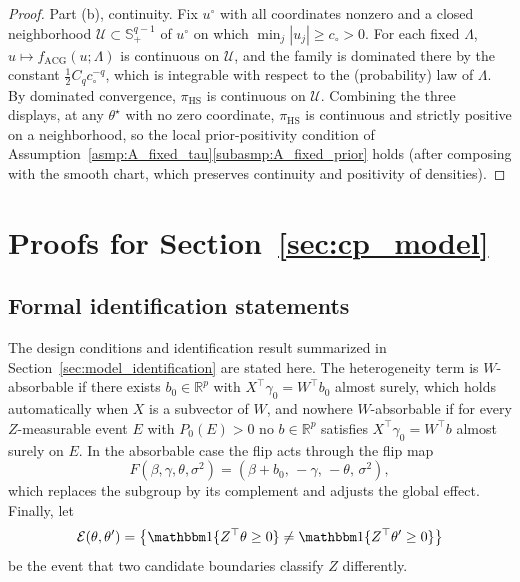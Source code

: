 \documentclass[11pt]{article}
\theoremstyle{definition}
\theoremstyle{plain}
\newcommand{\R}{\mathbb{R}}
\begin{document}
\begin{proof}
Part (b), continuity. Fix $u^\circ$ with all coordinates nonzero and a closed neighborhood $\mathcal U\subset\mathbb S^{q-1}_+$ of $u^\circ$ on which $\min_j|u_j|\ge c_\circ>0$. For each fixed $\Lambda$, $u\mapsto f_{\mathrm{ACG}}(u;\Lambda)$ is continuous on $\mathcal U$, and the family is dominated there by the constant $\tfrac12C_qc_\circ^{-q}$, which is integrable with respect to the (probability) law of $\Lambda$. By dominated convergence, $\pi_{\mathrm{HS}}$ is continuous on $\mathcal U$. Combining the three displays, at any $\theta^\star$ with no zero coordinate, $\pi_{\mathrm{HS}}$ is continuous and strictly positive on a neighborhood, so the local prior-positivity condition of Assumption~\ref{asmp:A_fixed_tau}\ref{subasmp:A_fixed_prior} holds (after composing with the smooth chart, which preserves continuity and positivity of densities).
\end{proof}



\section{Proofs for Section~\ref{sec:cp_model}}\label{sec:proofs_sec2}

\subsection{Formal identification statements}

The design conditions and identification result summarized in Section~\ref{sec:model_identification} are stated here. The heterogeneity term is $W$-absorbable if there exists $b_0\in\R^p$ with $X^\top\gamma_0=W^\top b_0$ almost surely, which holds automatically when $X$ is a subvector of $W$, and nowhere $W$-absorbable if for every $Z$-measurable event $E$ with $P_0(E)>0$ no $b\in\R^p$ satisfies $X^\top\gamma_0=W^\top b$ almost surely on $E$. In the absorbable case the flip acts through the flip map
\[
F(\beta,\gamma,\theta,\sigma^2)=(\beta+b_0,\,-\gamma,\,-\theta,\,\sigma^2),
\]
which replaces the subgroup by its complement and adjusts the global effect. Finally, let
\[
\mathcal E(\theta,\theta')=\big\{\mathbbm 1\{Z^\top\theta\ge0\}\neq\mathbbm 1\{Z^\top\theta'\ge0\}\big\}
\]
be the event that two candidate boundaries classify $Z$ differently.
\end{document}
